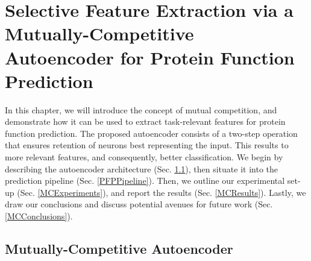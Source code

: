 %
%
%
%
%

\chapter[Selective Feature Extraction via a Mutually-Competitive Autoencoder]{
    \huge
    Selective Feature Extraction via a Mutually-Competitive Autoencoder
    for Protein Function Prediction
} 
\label{SelectiveChapter}

\par In this chapter, we will introduce the concept of mutual competition,
and demonstrate how it can be used to extract task-relevant features for
protein function prediction. The proposed autoencoder consists of a two-step
operation that ensures retention of neurons best representing the input. This
results to more relevant features, and consequently, better classification.
We begin by describing the autoencoder architecture (Sec.
\ref{MCArchitecture}), then situate it into the prediction pipeline (Sec.
\ref{PFPPipeline}). Then, we outline our experimental set-up (Sec.
\ref{MCExperiments}), and report the results (Sec. \ref{MCResults}). Lastly,
we draw our conclusions and discuss potential avenues for future work (Sec.
\ref{MCConclusions}).


\section{Mutually-Competitive Autoencoder}
\label{MCArchitecture}

